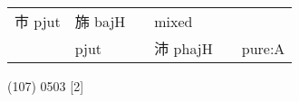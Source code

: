 \documentclass[14pt,a4paper]{scrartcl}
\begin{document}
\begin{longtable}[c]{@{}llllll@{}}
\begin{minipage}[t]{0.14\columnwidth}
巿 pjut
\strut\end{minipage} &
\begin{minipage}[t]{0.14\columnwidth}\raggedright\strut
旆 bajH
\strut\end{minipage} &
\begin{minipage}[t]{0.14\columnwidth}\raggedright\strut
\strut\end{minipage} &
\begin{minipage}[t]{0.14\columnwidth}\raggedright\strut
mixed
\strut\end{minipage}\tabularnewline
\begin{minipage}[t]{0.14\columnwidth}\raggedright\strut
𣎳
\strut\end{minipage} &
\begin{minipage}[t]{0.14\columnwidth}\raggedright\strut
pjut
\strut\end{minipage} &
\begin{minipage}[t]{0.14\columnwidth}\raggedright\strut
\strut\end{minipage} &
\begin{minipage}[t]{0.14\columnwidth}\raggedright\strut
沛 phajH
\strut\end{minipage} &
\begin{minipage}[t]{0.14\columnwidth}\raggedright\strut
\strut\end{minipage} &
\begin{minipage}[t]{0.14\columnwidth}\raggedright\strut
pure:A
\strut\end{minipage}\tabularnewline
\bottomrule
\end{longtable}

(107) 0503 {[}2{]}
\end{document}
